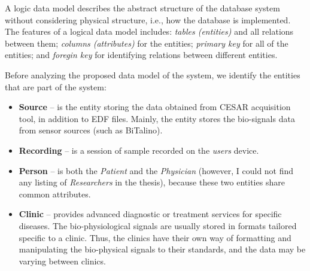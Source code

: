 

A logic data model describes the abstract structure of the database system without considering physical structure, i.e., how the database is implemented. The features of a logical data model includes: \textit{tables (entities)} and all relations between them; \textit{columns (attributes)} for the entities; \textit{primary key} for all of the entities; and \textit{foregin key} for identifying relations between different entities. 

Before analyzing the proposed data model of the system, we identify the entities that are part of the system:
\begin{itemize}
    \item \textbf{Source} -- is the entity storing the data obtained from CESAR acquisition tool, in addition to EDF files. Mainly, the entity stores the bio-signals data from sensor sources (such as BiTalino). 
    \item \textbf{Recording} -- is a session of sample recorded on the \textit{users} device. 
    \item \textbf{Person} -- is both the \textit{Patient} and the \textit{Physician} (however, I could not find any listing of \textit{Researchers} in the thesis), because these two entities share common attributes. 
    \item \textbf{Clinic} -- provides advanced diagnostic or treatment services for specific diseases. The bio-physiological signals are usually stored in formats tailored specific to a
clinic. Thus, the clinics have their own way of formatting and manipulating the
bio-physical signals to their standards, and the data may be varying
between clinics.
\end{itemize}

